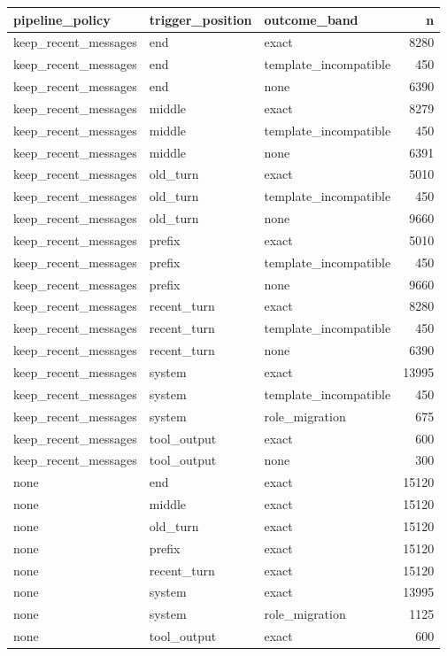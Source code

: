 \begin{tabular}{lllr}
\toprule
pipeline_policy & trigger_position & outcome_band & n \\
\midrule
keep_recent_messages & end & exact & 8280 \\
keep_recent_messages & end & template_incompatible & 450 \\
keep_recent_messages & end & none & 6390 \\
keep_recent_messages & middle & exact & 8279 \\
keep_recent_messages & middle & template_incompatible & 450 \\
keep_recent_messages & middle & none & 6391 \\
keep_recent_messages & old_turn & exact & 5010 \\
keep_recent_messages & old_turn & template_incompatible & 450 \\
keep_recent_messages & old_turn & none & 9660 \\
keep_recent_messages & prefix & exact & 5010 \\
keep_recent_messages & prefix & template_incompatible & 450 \\
keep_recent_messages & prefix & none & 9660 \\
keep_recent_messages & recent_turn & exact & 8280 \\
keep_recent_messages & recent_turn & template_incompatible & 450 \\
keep_recent_messages & recent_turn & none & 6390 \\
keep_recent_messages & system & exact & 13995 \\
keep_recent_messages & system & template_incompatible & 450 \\
keep_recent_messages & system & role_migration & 675 \\
keep_recent_messages & tool_output & exact & 600 \\
keep_recent_messages & tool_output & none & 300 \\
none & end & exact & 15120 \\
none & middle & exact & 15120 \\
none & old_turn & exact & 15120 \\
none & prefix & exact & 15120 \\
none & recent_turn & exact & 15120 \\
none & system & exact & 13995 \\
none & system & role_migration & 1125 \\
none & tool_output & exact & 600 \\

\end{tabular}
